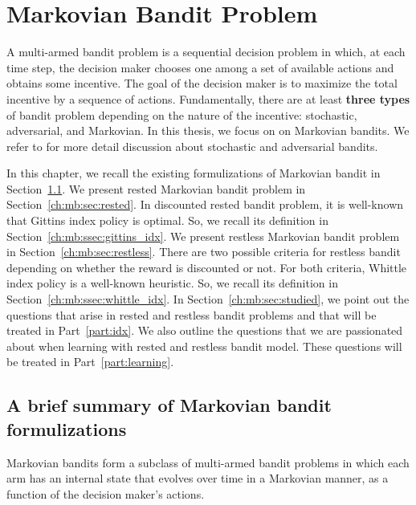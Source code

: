 \begingroup
\let\clearpage\relax

\chapter{Markovian Bandit Problem}
\label{ch:mb}

A multi-armed bandit problem is a sequential decision problem in which, at each time step, the decision maker chooses one among a set of available actions and obtains some incentive.
The goal of the decision maker is to maximize the total incentive by a sequence of actions.
Fundamentally, there are at least \textbf{three types} of bandit problem depending on the nature of the incentive: stochastic, adversarial, and Markovian.
In this thesis, we focus on on Markovian bandits.
We refer to \cite{bubeck2012regret} for more detail discussion about stochastic and adversarial bandits.

In this chapter, we recall the existing formulizations of Markovian bandit in Section~\ref{ch:mb:sec:summary}.
We present rested Markovian bandit problem in Section~\ref{ch:mb:sec:rested}.
In discounted rested bandit problem, it is well-known that Gittins index policy is optimal.
So, we recall its definition in Section~\ref{ch:mb:ssec:gittins_idx}.
We present restless Markovian bandit problem in Section~\ref{ch:mb:sec:restless}.
There are two possible criteria for restless bandit depending on whether the reward is discounted or not.
For both criteria, Whittle index policy is a well-known heuristic. So, we recall its definition in Section~\ref{ch:mb:ssec:whittle_idx}.
In Section~\ref{ch:mb:sec:studied}, we point out the questions that arise in rested and restless bandit problems and that will be treated in Part~\ref{part:idx}.
We also outline the questions that we are passionated about when learning with rested and restless bandit model.
These questions will be treated in Part~\ref{part:learning}.

\section{A brief summary of Markovian bandit formulizations}
\label{ch:mb:sec:summary}

Markovian bandits form a subclass of multi-armed bandit problems in which each arm has an internal state that evolves over time in a Markovian manner, as a function of the decision maker’s actions.

